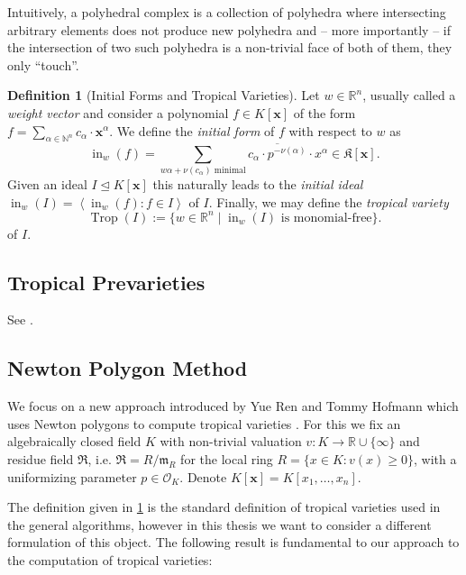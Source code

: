 \documentclass[
  paper=a4,
  DIV=14,
  fontsize=12pt,
  titlepage,
  bibliography=totoc,
  pagesize=pdftex
]{scrartcl}
\numberwithin{figure}{section}
\numberwithin{equation}{section}
\numberwithin{table}{section}
\newcommand*\setR{\mathds{R}}
\newcommand*\setN{\mathds{N}}
\newcommand*\ideal[1]{\left\langle #1 \right\rangle}
\let\vec\mathbf
\let\idealof\trianglelefteq
\DeclareMathOperator{\Trop}{Trop}
\DeclareMathOperator{\initial}{in}
\theoremstyle{definition}
\newtheorem{definition}{Definition}
\numberwithin{definition}{section}
\begin{document}
Intuitively, a polyhedral complex is a collection of polyhedra where intersecting
arbitrary elements does not produce new polyhedra and -- more importantly -- if the
intersection of two such polyhedra is a non-trivial face of both of them, they only
\enquote{touch}.


\begin{definition}[Initial Forms and Tropical Varieties]
  Let $w \in \setR^n$, usually called a \emph{weight vector} and consider a polynomial $f
  \in K[\vec x]$ of the form $f = \sum_{\alpha \in \setN^n} c_\alpha \cdot \vec x^\alpha$.
  We define the \emph{initial form} of $f$ with respect to $w$ as
  \[
    \initial_w(f) = \sum_{w\alpha + \nu(c_\alpha) \text{ minimal}}
    \overline{c_\alpha \cdot p^{-\nu(\alpha)}} \cdot x^\alpha
    \in \mathfrak K[\vec x].
  \]
  Given an ideal $I \idealof K[\vec x]$ this naturally leads to the \emph{initial ideal}
  $\initial_w(I) = \ideal{\initial_w(f) : f\in I}$ of $I$. Finally, we may define the
  \emph{tropical variety}
  \[
    \Trop(I) := \{ w \in \setR^n \mid \initial_w(I) \text{ is monomial-free} \}.
  \]
  of $I$.
  \label{def:tropicalVariety}
\end{definition}

\subsection{Tropical Prevarieties}

See \cite{compTropVar}.

\subsection{Newton Polygon Method}

We focus on a new approach introduced by Yue Ren and Tommy Hofmann which uses Newton
polygons to compute tropical varieties \cite{tropPointsLinks}. For this we fix an
algebraically closed field $K$ with non-trivial valuation $v:K\to\setR \cup \{\infty\}$
and residue field $\mathfrak R$, i.e. $\mathfrak R = R/\mathfrak m_R$ for the local ring
$R = \{ x \in K : v(x) \geq 0 \}$, with a uniformizing parameter $p\in \mathcal O_K$.
Denote $K[\vec x] = K[x_1, \ldots, x_n]$.

The definition given in \ref{def:tropicalVariety} is the standard definition of tropical
varieties used in the general algorithms, however in this thesis we want to consider a
different formulation of this object. The following result is fundamental to our approach
to the computation of tropical varieties:
\end{document}

